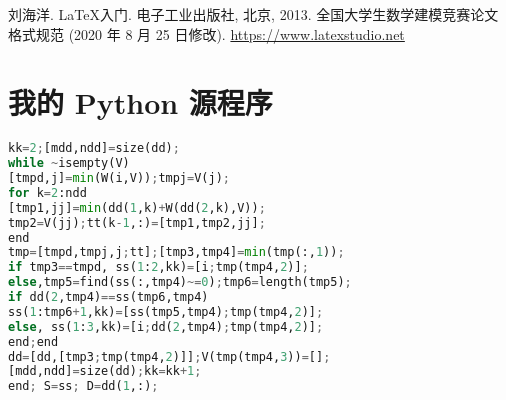 \documentclass[bwprint]{gmcmthesis}
\begin{document}

% 
% 


\begin{thebibliography}{9}%
    刘海洋.
    \newblock \LaTeX {}入门\allowbreak[J].
    \newblock 电子工业出版社, 北京, 2013.
    全国大学生数学建模竞赛论文格式规范 (2020 年 8 月 25 日修改).
     \url{https://www.latexstudio.net}
\end{thebibliography}






\newpage
\appendix
\section{我的 Python 源程序}
\begin{lstlisting}[language=Python]%设置不同语言即可。
kk=2;[mdd,ndd]=size(dd);
while ~isempty(V)
[tmpd,j]=min(W(i,V));tmpj=V(j);
for k=2:ndd
[tmp1,jj]=min(dd(1,k)+W(dd(2,k),V));
tmp2=V(jj);tt(k-1,:)=[tmp1,tmp2,jj];
end
tmp=[tmpd,tmpj,j;tt];[tmp3,tmp4]=min(tmp(:,1));
if tmp3==tmpd, ss(1:2,kk)=[i;tmp(tmp4,2)];
else,tmp5=find(ss(:,tmp4)~=0);tmp6=length(tmp5);
if dd(2,tmp4)==ss(tmp6,tmp4)
ss(1:tmp6+1,kk)=[ss(tmp5,tmp4);tmp(tmp4,2)];
else, ss(1:3,kk)=[i;dd(2,tmp4);tmp(tmp4,2)];
end;end
dd=[dd,[tmp3;tmp(tmp4,2)]];V(tmp(tmp4,3))=[];
[mdd,ndd]=size(dd);kk=kk+1;
end; S=ss; D=dd(1,:);


 \end{lstlisting}
\end{document}
